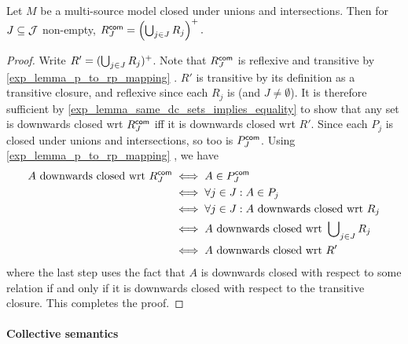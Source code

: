 \begin{proposition}
\label{exp_prop_rcommon}
Let $M$ be a multi-source model closed under unions and intersections.
Then for $J \subseteq \mathcal{J}$ non-empty,
$
R^{\mathsf{com}}_J = \left(
  \bigcup\nolimits_{j \in J}{R_j}
\right)^{+}.$
\end{proposition}
\begin{proof}

    Write $R' = (\bigcup_{j \in J}{R_j})^{+}$. Note that $R^{\mathsf{com}}_J$ is
    reflexive and transitive by \cref{exp_lemma_p_to_rp_mapping}
    . $R'$ is transitive by its definition as a
    transitive closure, and reflexive since each $R_j$ is (and $J \ne
    \emptyset$).
    It is therefore sufficient by
\cref{exp_lemma_same_dc_sets_implies_equality} to show that any set
is downwards closed wrt $R^{\mathsf{com}}_J$ iff it is
downwards closed wrt $R'$. Since each $P_j$ is closed under
unions and intersections, so too is $P^{\mathsf{com}}_J$. Using
\cref{exp_lemma_p_to_rp_mapping} , we have
\[
\begin{aligned}
   A \text{ downwards closed wrt } R^{\mathsf{com}}_J
   &\iff A \in P^{\mathsf{com}}_J \\
   &\iff \forall j \in J: A \in P_j \\
   &\iff \forall j \in J: A \text{ downwards closed wrt } R_j \\
   &\iff A \text{ downwards closed wrt } \bigcup\nolimits_{j \in J}{R_j} \\
   &\iff A \text{ downwards closed wrt } R'
\end{aligned}\]
where the last step uses the fact that $A$ is downwards closed with respect to
some relation if and only if it is downwards closed with respect to the
transitive closure. This completes the proof.
\end{proof}

\paragraph{Collective semantics}

